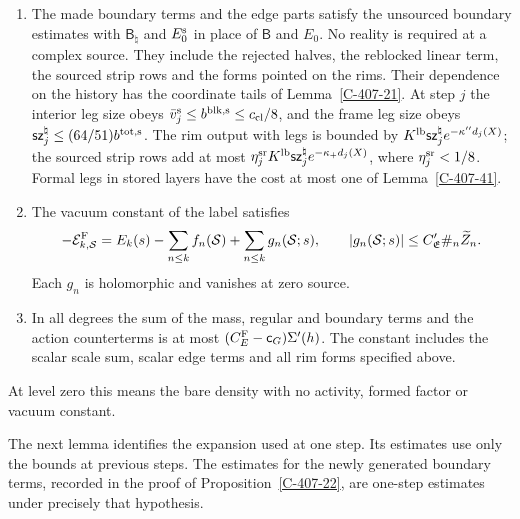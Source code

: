 \documentclass[11pt,letterpaper,reqno]{amsart}
\makeatletter
\theoremstyle{definition}
\newcommand{\ms@minorstart}{%
  \pushQED{\qed}\renewcommand{\qedsymbol}{$\blacksquare$}}
\newenvironment{definition}[1][]{\ms@minorstart\ms@definition[#1]}
  {\popQED\endms@definition}
\theoremstyle{remark}
\makeatother
\begin{document}
\begin{definition}[The sourced inductive statement]
\begin{enumerate}
pointer. The pointed sum rule holds, the source-step sizes
hold, and the scalar entries and their edge parts satisfy
Lemma~\ref{C-407-40}.
\item The made boundary terms and the edge parts satisfy the
unsourced boundary estimates with $\mathsf B_\natural$ and
$E_0^{\rm s}$ in place of $\mathsf B$ and $E_0$. No reality
is required at a complex source. They include the rejected
halves, the reblocked linear term, the sourced strip rows and
the forms pointed on the rims. Their dependence on the history
has the coordinate tails of Lemma~\ref{C-407-21}. At step $j$
the interior leg size obeys
$\bar v_j^{\rm s}\le b^{\rm blk,s}\le c_{\rm cl}/8$,
and the frame leg size obeys
$\mathsf{sz}_j^\natural\le(64/51)b^{\rm tot,s}$.
The rim output with legs is bounded by
$K^{\rm lb}\mathsf{sz}_j^\natural e^{-\kappa''d_j(X)}$;
the sourced strip rows add at most
$\eta_j^{\rm sr}K^{\rm lb}\mathsf{sz}_j^\natural
e^{-\kappa_+d_j(X)}$, where $\eta_j^{\rm sr}<1/8$.
Formal legs in stored layers have the cost at most one of
Lemma~\ref{C-407-41}.
\item The vacuum constant of the label satisfies
\[
 -\mathcal E^{\rm F}_{k,\mathcal S}
   =E_k(s)-\sum_{n\le k}f_n(\mathcal S)
                    +\sum_{n\le k}g_n(\mathcal S;s),
 \qquad |g_n(\mathcal S;s)|\le C'_{\mathfrak E}
                                     \#_n\widetilde Z_n.
\]
Each $g_n$ is holomorphic and vanishes at zero source.
\item In all degrees the sum of the mass, regular and boundary
terms and the action counterterms is at most
$(C_E^{\rm F}-\mathsf c_G)\Sigma'(h)$. The constant includes
the scalar scale sum, scalar edge terms and all rim forms
specified above.
\end{enumerate}
At level zero this means the bare density with no activity,
formed factor or vacuum constant.
\end{definition}

The next lemma identifies the expansion used at one step. Its
estimates use only the bounds at previous steps. The estimates
for the newly generated boundary terms, recorded in the proof of
Proposition~\ref{C-407-22}, are one-step estimates under precisely
that hypothesis.
\end{document}
